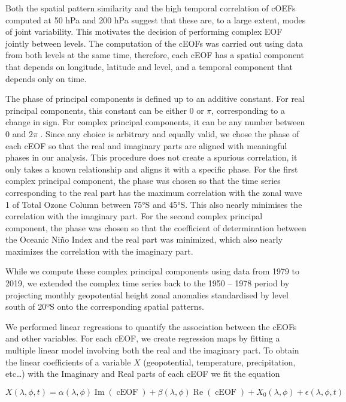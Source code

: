 \documentclass[smallextended]{svjour3}       %
\begin{document}
Both the spatial pattern similarity and the high temporal correlation of cOEFs computed at 50 hPa and 200 hPa suggest that these are, to a large extent, modes of joint variability.
This motivates the decision of performing complex EOF jointly between levels.
The computation of the cEOFs was carried out using data from both levels at the same time, therefore, each cEOF has a spatial component that depends on longitude, latitude and level, and a temporal component that depends only on time.

The phase of principal components is defined up to an additive constant.
For real principal components, this constant can be either 0 or \(\pi\), corresponding to a change in sign.
For complex principal components, it can be any number between 0 and \(2\pi\) \citep{horel1984}.
Since any choice is arbitrary and equally valid, we chose the phase of each cEOF so that the real and imaginary parts are aligned with meaningful phases in our analysis.
This procedure does not create a spurious correlation, it only takes a known relationship and aligns it with a specific phase.
For the first complex principal component, the phase was chosen so that the time series corresponding to the real part has the maximum correlation with the zonal wave 1 of Total Ozone Column between 75°S and 45°S.
This also nearly minimises the correlation with the imaginary part.
For the second complex principal component, the phase was chosen so that the coefficient of determination between the Oceanic Niño Index \citep{bamston1997} and the real part was minimized, which also nearly maximizes the correlation with the imaginary part.



While we compute these complex principal components using data from 1979 to 2019, we extended the complex time series back to the 1950 -- 1978 period by projecting monthly geopotential height zonal anomalies standardised by level south of 20ºS onto the corresponding spatial patterns.

We performed linear regressions to quantify the association between the cEOFs and other variables.
For each cEOF, we create regression maps by fitting a multiple linear model involving both the real and the imaginary part.
To obtain the linear coefficients of a variable \(X\) (geopotential, temperature, precipitation, etc\ldots) with the Imaginary and Real parts of each cEOF we fit the equation

\[
X(\lambda, \phi, t) = \alpha(\lambda, \phi) \operatorname{Im}(\operatorname{cEOF}) + \beta(\lambda, \phi) \operatorname{Re}(\operatorname{cEOF}) + X_0(\lambda, \phi) +  \epsilon(\lambda, \phi, t)
\]
\end{document}

